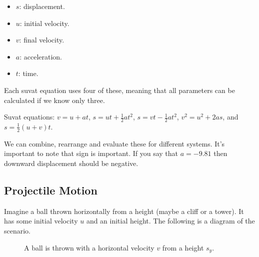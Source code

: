 \begin{itemize}
	\item $s$: displacement.
	\item $u$: initial velocity.
	\item $v$: final velocity.
	\item $a$: acceleration.
	\item $t$: time.
\end{itemize}

Each suvat equation uses four of these, meaning that all parameters can be calculated if we know only three.

\begin{definition}
	Suvat equations: $v=u+at$, $s=ut+\frac{1}{2}at^{2}$, $s=vt-\frac{1}{2}at^{2}$, $v^{2}=u^{2}+2as$, and $s=\frac{1}{2}(u+v)t$.
\end{definition}
We can combine, rearrange and evaluate these for different systems. It's important to note that sign is important. If you say that $a=-9.81$ then downward displacement should be negative.

\subsection{Projectile Motion}

Imagine a ball thrown horizontally from a height (maybe a cliff or a tower). It has some initial velocity $u$ and an initial height. The following is a diagram of the scenario.

\begin{figure}[ht]
\centering
	\caption{A ball is thrown with a horizontal velocity $v$ from a height $s_{y}$.}
\end{figure}

